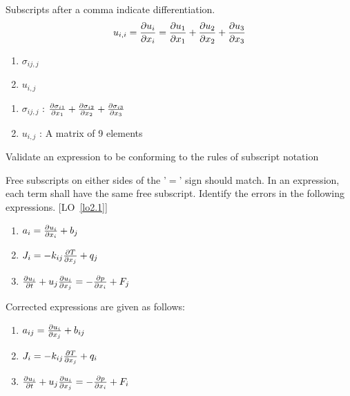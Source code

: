 
\begin{question}
Subscripts after a comma indicate differentiation.
$$ u_{i,i} = {\partial u_i \over \partial x_i} = {\partial u_1 \over \partial x_1} + {\partial u_2 \over \partial x_2} + {\partial u_3 \over \partial x_3} $$

	\begin{enumerate}
		\item $\sigma_{ij,j}$
		\item $u_{i,j}$
	\end{enumerate}
\end{question}
\begin{solution}[print]
	\begin{enumerate}
		\item $\sigma_{ij,j}$ : ${\partial \sigma_{i1} \over \partial x_1} + {\partial \sigma_{i2} \over \partial x_2} + {\partial \sigma_{i3} \over \partial x_3}$ 
		\item $u_{i,j}$ : A matrix of 9 elements
	\end{enumerate}
\end{solution}


\begin{lo2}[Tensors]
\label{lo2.1}
Validate an expression to be conforming to the rules of subscript notation
\end{lo2}


\begin{question}
Free subscripts on either sides of the '$=$' sign should match. In an expression, each term shall have the same free subscript.
	Identify the errors in the following expressions. [LO~\ref{lo2.1}]
	\begin{enumerate}
		\item $a_i = {\partial u_i \over \partial x_i} + b_j $
		\item $J_i = -k_{ij}{\partial T \over \partial x_j} + q_j$
		\item ${\partial u_i \over \partial t} + u_j {\partial u_i \over \partial x_j} = - {\partial p \over \partial x_i} + F_j $
	\end{enumerate}
\end{question}
\begin{solution}[print]
	Corrected expressions are given as follows:
	\begin{enumerate}
		\item $a_{ij} = {\partial u_i \over \partial x_j} + b_{ij} $
		\item $J_i = -k_{ij}{\partial T \over \partial x_j} + q_i$
		\item ${\partial u_i \over \partial t} + u_j {\partial u_i \over \partial x_j} = - {\partial p \over \partial x_i} + F_i $ 
	\end{enumerate}
\end{solution}


